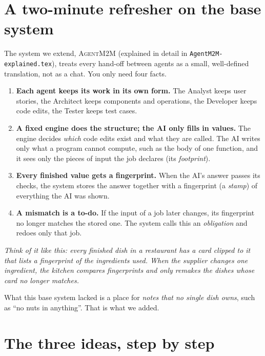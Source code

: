 \documentclass[10pt,a4paper]{article}
\newcommand{\tool}{\textsc{AgentM2M}}
\newcommand{\file}[1]{\texttt{#1}}
\newcommand{\analogy}[1]{\par\smallskip\noindent\textit{Think of it like this: #1}\par\smallskip}
\begin{document}
\section{A two-minute refresher on the base system}\label{sec:base}

The system we extend, \tool{} (explained in detail in \file{AgentM2M-explained.tex}), treats every
hand-off between agents as a small, well-defined translation, not as a chat. You only need four facts.

\begin{enumerate}[leftmargin=*]
\item \textbf{Each agent keeps its work in its own form.} The Analyst keeps user stories, the Architect keeps
      components and operations, the Developer keeps code edits, the Tester keeps test cases.
\item \textbf{A fixed engine does the structure; the AI only fills in values.} The engine decides \emph{which}
      code edits exist and what they are called. The AI writes only what a program cannot compute, such as the
      body of one function, and it sees only the pieces of input the job declares (its \emph{footprint}).
\item \textbf{Every finished value gets a fingerprint.} When the AI's answer passes its checks, the system
      stores the answer together with a fingerprint (a \emph{stamp}) of everything the AI was shown.
\item \textbf{A mismatch is a to-do.} If the input of a job later changes, its fingerprint no longer matches
      the stored one. The system calls this an \emph{obligation} and redoes only that job.
\end{enumerate}

\analogy{every finished dish in a restaurant has a card clipped to it that lists a fingerprint of the
ingredients used. When the supplier changes one ingredient, the kitchen compares fingerprints and only remakes
the dishes whose card no longer matches.}

What this base system lacked is a place for \emph{notes that no single dish owns}, such as ``no nuts in
anything''. That is what we added.

\section{The three ideas, step by step}\label{sec:ideas}
\end{document}
